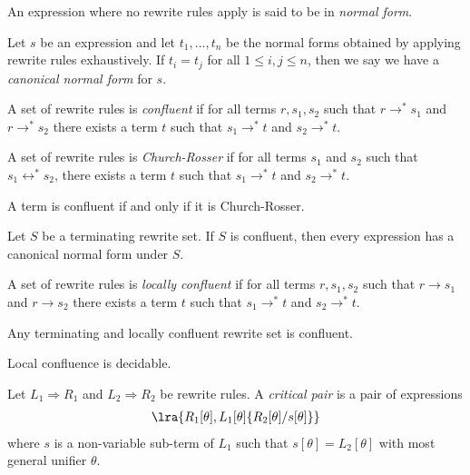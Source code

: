 \documentclass{article}
\begin{document}
\begin{definition}
	An expression where no rewrite rules apply is said to be in \emph{normal form}.
\end{definition}

\begin{definition}
	Let $s$ be an expression and let $t_1, ..., t_n$ be the normal forms obtained by
	applying rewrite rules exhaustively. If $t_i=t_j$ for all $1\leq i,j\leq n$, then we
	say we have a \emph{canonical normal form} for $s$.
\end{definition}

\begin{definition}
	A set of rewrite rules is \emph{confluent} if for all terms $r,s_1,s_2$ such that
	$r\to^*s_1$ and $r\to^*s_2$ there exists a term $t$ such that
	$s_1\to^*t$ and $s_2\to^*t$.
\end{definition}

\begin{definition}
	A set of rewrite rules is \emph{Church-Rosser} if for all terms $s_1$ and $s_2$
	such that $s_1\leftrightarrow^* s_2$, there exists a term $t$ such that $s_1\to^*t$
	and $s_2\to^* t$.
\end{definition}

\begin{theorem}
	A term is confluent if and only if it is Church-Rosser.
\end{theorem}

\begin{theorem}
	Let $S$ be a terminating rewrite set. If $S$ is confluent, then every expression has a
	canonical normal form under $S$.
\end{theorem}

\begin{definition}
	A set of rewrite rules is \emph{locally confluent} if for all terms $r,s_1,s_2$ such that
	$r\to s_1$ and $r\to s_2$ there exists a term $t$ such that
	$s_1\to^*t$ and $s_2\to^*t$.
\end{definition}

\begin{lemma}[Newman]
	Any terminating and locally confluent rewrite set is confluent.
\end{lemma}

\begin{theorem}
	Local confluence is decidable.
\end{theorem}

\begin{definition}
	Let $L_1\Rightarrow R_1$ and $L_2\Rightarrow R_2$ be rewrite rules. A \emph{critical pair} is
	a pair of expressions
	\begin{align*}
		\lra{R_1[\theta], L_1[\theta]\{R_2[\theta]/s[\theta]\}}
	\end{align*}
	where $s$ is a non-variable sub-term of $L_1$ such that $s[\theta]=L_2[\theta]$ with
	most general unifier $\theta$.
\end{definition}
\end{document}
